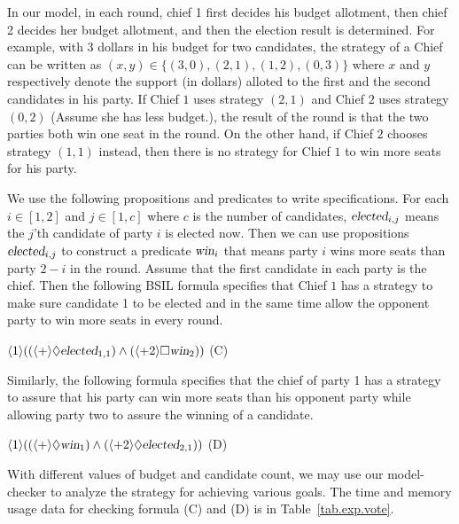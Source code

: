 \documentclass[11pt]{article}
\newcommand{\pfrr}{\Box}
\newcommand{\pevt}{\Diamond}
\begin{document}
In our model, in each round, chief 1 first decides his budget allotment, 
then chief 2 decides her budget allotment, and 
then the election result is determined.  
For example, with 3 dollars in his budget for two candidates, 
the strategy of a Chief can be written as 
$(x,y)\in\{(3,0), (2,1),(1,2),(0,3)\}$ where $x$ and $y$ 
respectively denote the support (in dollars) 
alloted to the first and the second candidates in his party. 
If Chief $1$ uses strategy $(2,1)$ and 
Chief $2$ uses strategy $(0,2)$ (Assume she has less budget.), 
the result of the round is 
that the two parties both win one seat in the round. 
On the other hand, if Chief $2$ chooses strategy $(1,1)$ instead, 
then there is no strategy for Chief $1$ to win more seats for his party. 



We use the following propositions and predicates to write 
specifications.  
For each $i\in[1,2]$ and $j\in[1,c]$ where $c$ is the number of 
candidates, 
$\textsl{elected}_{i,j}$ means the $j$'th candidate of party $i$ is 
elected now. 
Then we can use propositions $\textsl{elected}_{i,j}$ to construct 
a predicate $\textsl{win}_i$ that means party $i$ wins more seats than party $2-i$ in the round. 
Assume that the first candidate in each party is the chief. 
Then the following BSIL formula specifies that 
Chief $1$ has a strategy to make sure candidate 1 to be elected  
and in the same time allow the opponent party to win more seats in every round.
\begin{center} 
\hfill 
$\langle 1\rangle((\langle +\rangle\pevt \textsl{elected}_{1,1})
\wedge(\langle+2\rangle\pfrr \textsl{win}_2))$
\hfill (C) 
\end{center} 
Similarly, the following formula specifies that 
the chief of party 1 has a strategy to assure that his party 
can win more seats than his opponent party while allowing party two to assure 
the winning of a candidate.  
\begin{center} 
\hfill $\langle 1\rangle((\langle +\rangle \pevt \textsl{win}_1)
\wedge(\langle +2\rangle\pevt \textsl{elected}_{2,1}))$
\hfill (D)
\end{center} 
With different values of budget and candidate count, we may use our model-checker 
to analyze the strategy for achieving various goals.  
The time and memory usage data for checking formula (C) and (D) 
is in Table~\ref{tab.exp.vote}.
\end{document}
